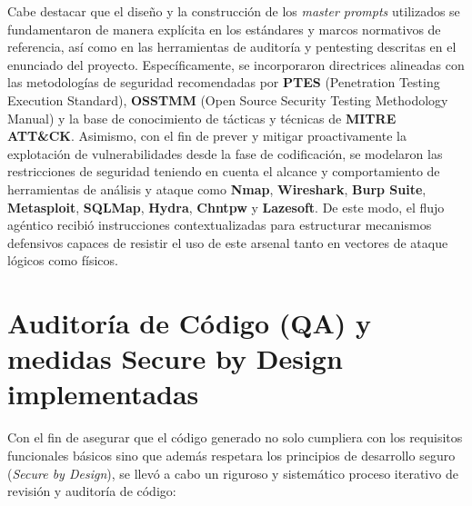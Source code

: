 Cabe destacar que el diseño y la construcción de los \textit{master prompts} utilizados se fundamentaron de manera explícita en los estándares y marcos normativos de referencia, así como en las herramientas de auditoría y pentesting descritas en el enunciado del proyecto. Específicamente, se incorporaron directrices alineadas con las metodologías de seguridad recomendadas por \textbf{PTES} (Penetration Testing Execution Standard), \textbf{OSSTMM} (Open Source Security Testing Methodology Manual) y la base de conocimiento de tácticas y técnicas de \textbf{MITRE ATT\&CK}. Asimismo, con el fin de prever y mitigar proactivamente la explotación de vulnerabilidades desde la fase de codificación, se modelaron las restricciones de seguridad teniendo en cuenta el alcance y comportamiento de herramientas de análisis y ataque como \textbf{Nmap}, \textbf{Wireshark}, \textbf{Burp Suite}, \textbf{Metasploit}, \textbf{SQLMap}, \textbf{Hydra}, \textbf{Chntpw} y \textbf{Lazesoft}. De este modo, el flujo agéntico recibió instrucciones contextualizadas para estructurar mecanismos defensivos capaces de resistir el uso de este arsenal tanto en vectores de ataque lógicos como físicos.

\section[Auditoría de Código (QA)]{Auditoría de Código (QA) y medidas Secure by Design implementadas}
\label{sec:auditoria_codigo}

Con el fin de asegurar que el código generado no solo cumpliera con los requisitos funcionales básicos sino que además respetara los principios de desarrollo seguro (\textit{Secure by Design}), se llevó a cabo un riguroso y sistemático proceso iterativo de revisión y auditoría de código:

